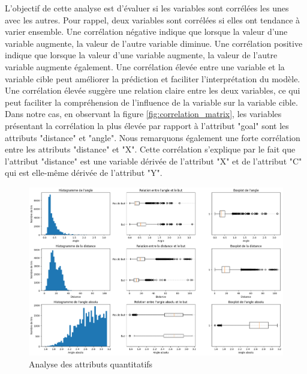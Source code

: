 \documentclass[12pt]{article}
\begin{document}
L'objectif de cette analyse est d'évaluer si les variables sont corrélées les unes avec les autres.
Pour rappel, deux variables sont corrélées si elles ont tendance à varier ensemble. 
Une corrélation négative indique que lorsque la valeur d'une variable augmente, la valeur de l'autre variable diminue. 
Une corrélation positive indique que lorsque la valeur d'une variable augmente, la valeur de l'autre variable augmente également. 
Une corrélation élevée entre une variable et la variable cible peut améliorer la prédiction et faciliter l'interprétation du modèle. 
Une corrélation élevée suggère une relation claire entre les deux variables, ce qui peut faciliter la compréhension de l'influence de la variable sur la variable cible.
\newline\newline
Dans notre cas, en observant la figure \ref{fig:correlation_matrix}, les variables présentant la corrélation la plus élevée par rapport à l'attribut "goal" sont les attributs "distance" et "angle". 
Nous remarquons également une forte corrélation entre les attributs "distance" et "X". 
Cette corrélation s'explique par le fait que l'attribut "distance" est une variable dérivée de l'attribut "X" et de l'attribut "C" qui est elle-même dérivée de l'attribut "Y".
\begin{figure}[htp]
    \centering
    \includegraphics[width=\textwidth]{img/analyseOutlier.png}
    \caption{Analyse des attributs quantitatifs}
    \label{fig:analyse_quantitative}
\end{figure}
\end{document}
